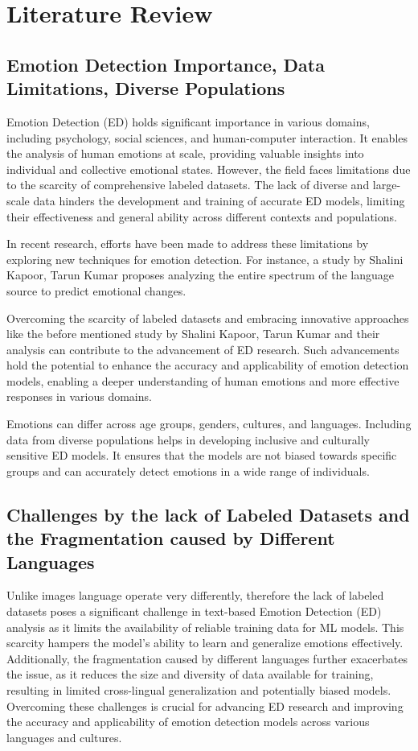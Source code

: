 \documentclass[11pt]{article}
\begin{document}
\section{Literature Review}

\subsection{Emotion Detection Importance, Data Limitations, Diverse Populations}
Emotion Detection (ED) holds significant importance in various domains, including psychology, social sciences, and human-computer interaction. It enables the analysis of human emotions at scale, providing valuable insights into individual and collective emotional states. However, the field faces limitations due to the scarcity of comprehensive labeled datasets. The lack of diverse and large-scale data hinders the development and training of accurate ED models, limiting their effectiveness and general ability across different contexts and populations.

In recent research, efforts have been made to address these limitations by exploring new techniques for emotion detection. For instance, a study by Shalini Kapoor, Tarun Kumar \cite{KAPOOR2023120882} proposes analyzing the entire spectrum of the language source to predict emotional changes. 

Overcoming the scarcity of labeled datasets and embracing innovative approaches like the before mentioned study by Shalini Kapoor, Tarun Kumar \cite{KAPOOR2023120882} and their analysis can contribute to the advancement of ED research. Such advancements hold the potential to enhance the accuracy and applicability of emotion detection models, enabling a deeper understanding of human emotions and more effective responses in various domains.

Emotions can differ across age groups, genders, cultures, and languages. Including data from diverse populations helps in developing inclusive and culturally sensitive ED models. It ensures that the models are not biased towards specific groups and can accurately detect emotions in a wide range of individuals.

\subsection{Challenges by the lack of Labeled Datasets and the Fragmentation caused by Different Languages}
Unlike images language operate very differently, therefore the lack of labeled datasets poses a significant challenge in text-based Emotion Detection (ED) analysis as it limits the availability of reliable training data for ML models. This scarcity hampers the model's ability to learn and generalize emotions effectively. Additionally, the fragmentation caused by different languages further exacerbates the issue, as it reduces the size and diversity of data available for training, resulting in limited cross-lingual generalization and potentially biased models. Overcoming these challenges is crucial for advancing ED research and improving the accuracy and applicability of emotion detection models across various languages and cultures.
\end{document}
